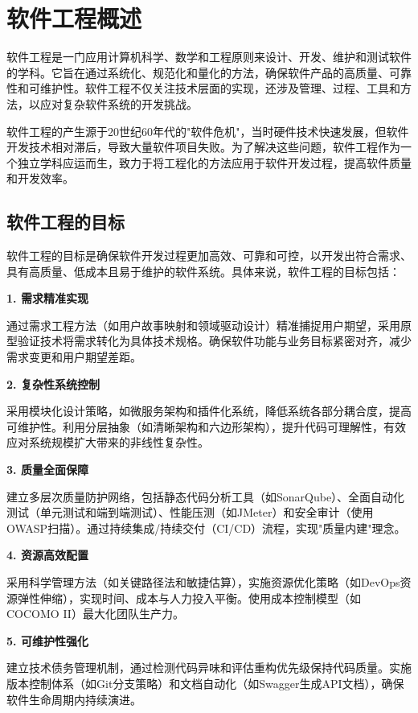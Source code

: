\section{软件工程概述}

软件工程是一门应用计算机科学、数学和工程原则来设计、开发、维护和测试软件的学科。它旨在通过系统化、规范化和量化的方法，确保软件产品的高质量、可靠性和可维护性。软件工程不仅关注技术层面的实现，还涉及管理、过程、工具和方法，以应对复杂软件系统的开发挑战。

软件工程的产生源于20世纪60年代的"软件危机"，当时硬件技术快速发展，但软件开发技术相对滞后，导致大量软件项目失败。为了解决这些问题，软件工程作为一个独立学科应运而生，致力于将工程化的方法应用于软件开发过程，提高软件质量和开发效率。

\subsection{软件工程的目标}

软件工程的目标是确保软件开发过程更加高效、可靠和可控，以开发出符合需求、具有高质量、低成本且易于维护的软件系统。具体来说，软件工程的目标包括：

\textbf{1. 需求精准实现}

通过需求工程方法（如用户故事映射和领域驱动设计）精准捕捉用户期望，采用原型验证技术将需求转化为具体技术规格。确保软件功能与业务目标紧密对齐，减少需求变更和用户期望差距。

\textbf{2. 复杂性系统控制}

采用模块化设计策略，如微服务架构和插件化系统，降低系统各部分耦合度，提高可维护性。利用分层抽象（如清晰架构和六边形架构），提升代码可理解性，有效应对系统规模扩大带来的非线性复杂性。

\textbf{3. 质量全面保障}

建立多层次质量防护网络，包括静态代码分析工具（如SonarQube）、全面自动化测试（单元测试和端到端测试）、性能压测（如JMeter）和安全审计（使用OWASP扫描）。通过持续集成/持续交付（CI/CD）流程，实现"质量内建"理念。

\textbf{4. 资源高效配置}

采用科学管理方法（如关键路径法和敏捷估算），实施资源优化策略（如DevOps资源弹性伸缩），实现时间、成本与人力投入平衡。使用成本控制模型（如COCOMO II）最大化团队生产力。

\textbf{5. 可维护性强化}

建立技术债务管理机制，通过检测代码异味和评估重构优先级保持代码质量。实施版本控制体系（如Git分支策略）和文档自动化（如Swagger生成API文档），确保软件生命周期内持续演进。

